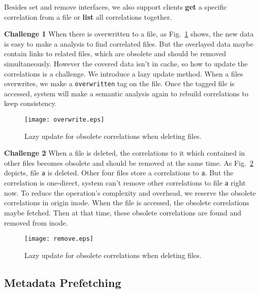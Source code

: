 Besides set and remove interfaces, we also support clients \textbf{get} a specific correlation from a file or \textbf{list} all correlations together.

\textbf{Challenge 1} When there is overwritten to a file, as Fig.~\ref{fig:overwrite} shows, the new data is easy to make a analysis to find correlated files. But the overlayed data maybe contain links to related files, which are obsolete and should be removed simultaneously. However the covered data isn't in cache, so how to update the correlations is a challenge. We introduce a lazy update method. When a files overwrites, we make a \texttt{overwritten} tag on the file. Once the tagged file is accessed, system will make a semantic analysis again to rebuild correlations to keep consistency.
\begin{figure}[htbp]
  \centering
  \texttt{[image: overwrite.eps]}\\
  \vspace{-10pt}
  \caption{Lazy update for obsolete correlations when deleting files.}\label{fig:overwrite}
\end{figure}

\textbf{Challenge 2} When a file is deleted, the correlations to it which contained in other files becomes obsolete and should be removed at the same time. As Fig.~\ref{fig:remove} depicts, file \texttt{a} is deleted. Other four files store a correlations to \texttt{a}. But the correlation is one-direct, system can't remove other correlations to file \texttt{a} right now. To reduce the operation's complexity and overhead, we reserve the obsolete correlations in origin inode. When the file is accessed, the obsolete correlations maybe fetched. Then at that time, these obsolete correlations are found and removed from inode.
\begin{figure}[htbp]
  \centering
  \texttt{[image: remove.eps]}\\
  \caption{Lazy update for obsolete correlations when deleting files.}\label{fig:remove}
\end{figure}

\subsection{Metadata Prefetching}

